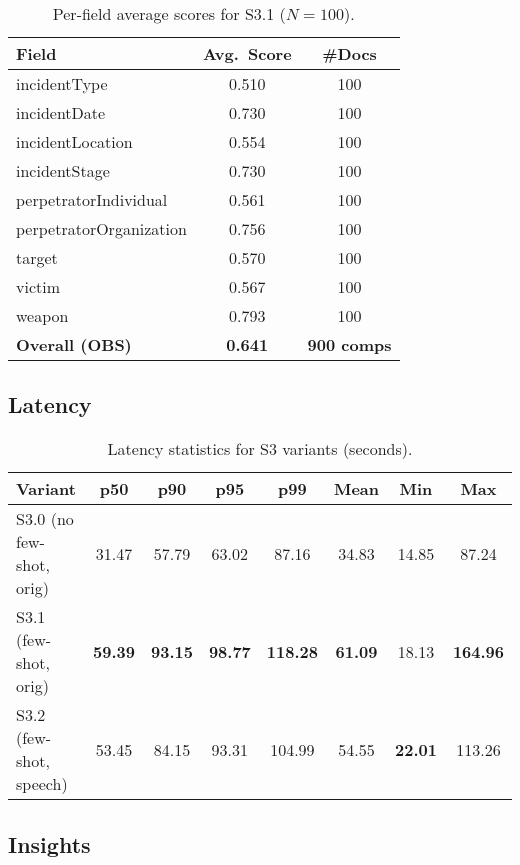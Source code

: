 \begin{table}[H]
    \centering
    \caption{Per-field average scores for S3.1 ($N{=}100$).}
    \label{tab:s3-perfield}
    \begin{tabular}{lcc}
        \toprule
        Field & Avg.\ Score & \#Docs \\
        \midrule
        incidentType & 0.510 & 100 \\
        incidentDate & 0.730 & 100 \\
        incidentLocation & 0.554 & 100 \\
        incidentStage & 0.730 & 100 \\
        perpetratorIndividual & 0.561 & 100 \\
        perpetratorOrganization & 0.756 & 100 \\
        target & 0.570 & 100 \\
        victim & 0.567 & 100 \\
        weapon & 0.793 & 100 \\
        \midrule
        \textbf{Overall (OBS)} & \textbf{0.641} & \textbf{900 comps} \\
        \bottomrule
    \end{tabular}
\end{table}

\subsection*{Latency}

\begin{table}[h]
    \centering
    \caption{Latency statistics for S3 variants (seconds).}
    \label{tab:s3-latency-all}
    \begin{tabular}{lccccccc}
        \toprule
        Variant & p50 & p90 & p95 & p99 & Mean & Min & Max \\
        \midrule
        S3.0 (no few-shot, orig) & 31.47 & 57.79 & 63.02 & 87.16 & 34.83 & 14.85 & 87.24 \\
        S3.1 (few-shot, orig)    & \textbf{59.39} & \textbf{93.15} & \textbf{98.77} & \textbf{118.28} & \textbf{61.09} & 18.13 & \textbf{164.96} \\
        S3.2 (few-shot, speech)  & 53.45 & 84.15 & 93.31 & 104.99 & 54.55 & \textbf{22.01} & 113.26 \\
        \bottomrule
    \end{tabular}
\end{table}

\subsection*{Insights}

